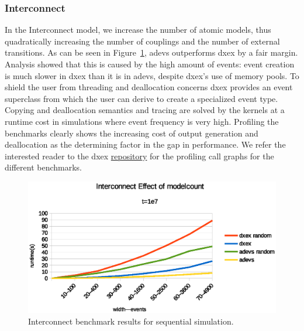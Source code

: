 \subsubsection{Interconnect}
\label{4-seq-Interconnect}
In the Interconnect model, we increase the number of atomic models, thus quadratically increasing the number of couplings and the number of external transitions.
As can be seen in Figure~\ref{fig:Interconnect_benchmark}, adevs outperforms dxex by a fair margin.
Analysis showed that this is caused by the high amount of events: event creation is much slower in dxex than it is in adevs, despite dxex's use of memory pools.
To shield the user from threading and deallocation concerns dxex provides an event superclass from which the user can derive to create a specialized event type.
Copying and deallocation semantics and tracing are solved by the kernels at a runtime cost in simulations where event frequency is very high.
Profiling the benchmarks clearly shows the increasing cost of output generation and deallocation as the determining factor in the gap in performance.
We refer the interested reader to the dxex \hyperref{https://bitbucket.org/bcardoen/devs-ex-machina}{}{repo}{repository} for the profiling call graphs for the different benchmarks.

\begin{figure}
	\center
	\includegraphics[width=\plotfraction\columnwidth]{fig/interconnect_sequential.eps}
	\caption{Interconnect benchmark results for sequential simulation.}
	\label{fig:Interconnect_benchmark}
\end{figure}

